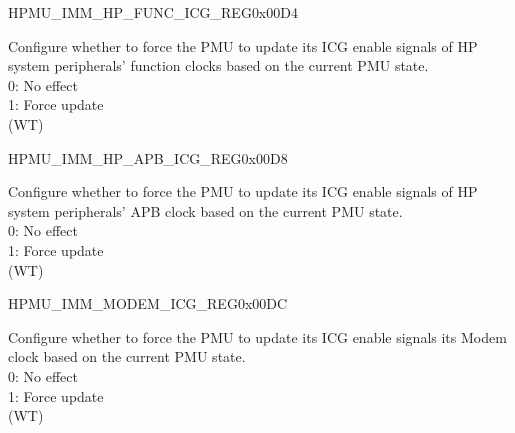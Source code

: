 \begin{register}{H}{PMU\_IMM\_HP\_FUNC\_ICG\_REG}{0x00D4}\label{regdesc:PMUIMMHPFUNCICGREG}
%
%
\regnewline%
\begin{regdesc}\begin{reglist}
\label{fielddesc:PMUUPDATEDIGICGFUNCEN}\item [PMU\_UPDATE\_DIG\_ICG\_FUNC\_EN] Configure whether to force the PMU to update its ICG enable signals of HP system peripherals' function clocks based on the current PMU state.\\
0: No effect\\
1: Force update\\
(WT)
\end{reglist}\end{regdesc}
\end{register}


\begin{register}{H}{PMU\_IMM\_HP\_APB\_ICG\_REG}{0x00D8}\label{regdesc:PMUIMMHPAPBICGREG}
%
%
\regnewline%
\begin{regdesc}\begin{reglist}
\label{fielddesc:PMUUPDATEDIGICGAPBEN}\item [PMU\_UPDATE\_DIG\_ICG\_APB\_EN] Configure whether to force the PMU to update its ICG enable signals of HP system peripherals' APB clock based on the current PMU state.\\
0: No effect\\
1: Force update\\
(WT)
\end{reglist}\end{regdesc}
\end{register}


\begin{register}{H}{PMU\_IMM\_MODEM\_ICG\_REG}{0x00DC}\label{regdesc:PMUIMMMODEMICGREG}
%
%
\regnewline%
\begin{regdesc}\begin{reglist}
\label{fielddesc:PMUUPDATEDIGICGMODEMEN}\item [PMU\_UPDATE\_DIG\_ICG\_MODEM\_EN] Configure whether to force the PMU to update its ICG enable signals its Modem clock based on the current PMU state.\\
0: No effect\\
1: Force update\\
(WT)
\end{reglist}\end{regdesc}
\end{register}



